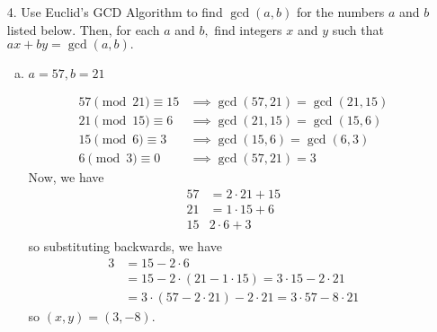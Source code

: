 \documentclass{article}
\begin{document}
\begin{itemize}
	\item[4.] Use Euclid's GCD Algorithm to find $\gcd(a, b)$ for the numbers $a$ and $b$ listed below. Then, for each $a$ and $b,$ find integers $x$ and $y$ such that $ax+by=\gcd(a, b).$
		\begin{enumerate}[(a)]
			\item $a=57, b=21$
				\begin{soln}
					\begin{align*}
						57\pmod{21} \equiv 15&\implies \gcd(57, 21) = \gcd(21, 15) \\
						21 \pmod {15}\equiv 6&\implies \gcd(21, 15) = \gcd(15, 6) \\
						15\pmod6\equiv 3 &\implies \gcd(15, 6) = \gcd(6, 3) \\
						6\pmod 3 \equiv 0 &\implies \gcd(57, 21) = \boxed3
					\end{align*}
					Now, we have
					\begin{align*}
						57 &= 2\cdot 21 + 15 \\
						21 &= 1\cdot 15 + 6 \\
						15 & 2\cdot 6 + 3 \\
					\end{align*}
					so substituting backwards, we have
					\begin{align*}
						3 &= 15-2\cdot 6 \\
						&= 15 - 2\cdot(21-1\cdot 15) = 3\cdot 15 - 2\cdot 21 \\
						&= 3\cdot(57-2\cdot 21) - 2\cdot 21 = 3\cdot 57 - 8\cdot 21
					\end{align*}
					so $(x, y) = (3, -8).$
				\end{soln}


\end{enumerate}
\end{itemize}
\end{document}
